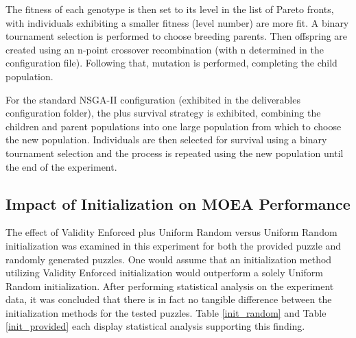 \documentclass[11pt]{article}
\begin{document}
The fitness of each genotype is then set to its level in the list of Pareto fronts, with
individuals exhibiting a smaller fitness (level number) are more fit. A binary tournament selection 
is performed to choose breeding parents. Then offspring are created using an n-point crossover
recombination (with n determined in the configuration file). Following that, mutation is performed,
completing the child population.

For the standard NSGA-II configuration (exhibited in the deliverables configuration folder),
the plus survival strategy is exhibited, combining the children and parent populations into 
one large population from which to choose the new population. Individuals are then selected for 
survival using a binary tournament selection and the process is repeated using the new population
until the end of the experiment.


\subsection{Impact of Initialization on MOEA Performance}

The effect of Validity Enforced plus Uniform Random versus Uniform Random initialization
was examined in this experiment for both the provided puzzle and randomly generated puzzles.
One would assume that an initialization method utilizing Validity
Enforced initialization would outperform a solely Uniform Random initialization. After performing 
statistical analysis on the experiment data, it was concluded that there is in fact no tangible difference
between the initialization methods for the tested puzzles. Table \ref{init_random} and Table \ref{init_provided} 
each display statistical analysis supporting this finding. 
\end{document}
